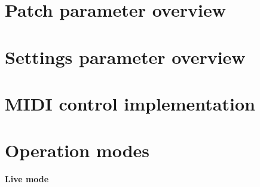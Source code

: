 \documentclass[landscape, 11pt, oneside]{report}
\newenvironment{flowtext}{\addmargin[0cm]{7cm}}{\endaddmargin} %
\begin{document}
\begin{flowtext}

\section{Patch parameter overview}\label{patchref}



\section{Settings parameter overview}\label{settingsref}



\section{MIDI control implementation}\label{midiimplenentation}



\end{flowtext}

\pagebreak

\section{Operation modes}\label{modes}

\textbf{Live mode}
\end{document}
